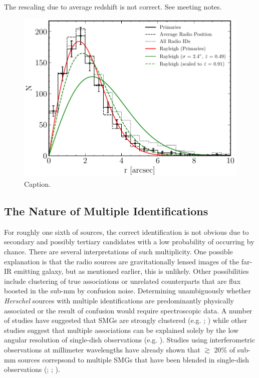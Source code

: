 {\color{red}The rescaling due to average redshift is not correct. See meeting notes.}

\begin{figure}
	\centering
	\includegraphics[width=0.75\columnwidth]{Figures/source_counterpart_offsets.pdf}
	\caption{{\color{red} Caption.}}
	\label{fig:source_counterpart_offset}
\end{figure}

\subsection{The Nature of Multiple Identifications}
\label{sec:multiple_systems}

For roughly one sixth of sources, the correct identification is not obvious due to secondary and possibly tertiary candidates with a low probability of occurring by chance. There are several interpretations of such multiplicity. One possible explanation is that the radio sources are gravitationally lensed images of the far-IR emitting galaxy, but as mentioned earlier, this is unlikely. Other possibilities include clustering of true associations or unrelated counterparts that are flux boosted in the sub-mm by confusion noise. Determining unambiguously whether \textit{Herschel} sources with multiple identifications are predominantly physically associated or the result of confusion would require spectroscopic data. A number of studies have suggested that SMGs are strongly clustered (e.g. \citealt{Blain_2004}; \citealt{Weiss_2009}) while other studies suggest that multiple associations can be explained solely by the low angular resolution of single-dish observations (e.g. \citealt{Williams_2011}). Studies using interferometric observations at millimeter wavelengths have already shown that $\gtrsim$ 20\% of sub-mm sources correpsond to multiple SMGs that have been blended in single-dish observations (\citealt{Karim_2013}; \citealt{Simpson_2015}; \citealt{Stach_2018}). 

